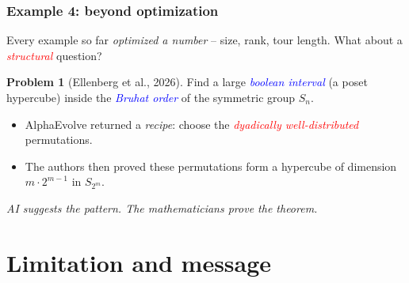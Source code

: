 \documentclass{beamer}
\theoremstyle{definition}
\newtheorem{prob}[thm]{Problem}
\newcommand\remph[1]{\emph{\textcolor{red}{#1}}}
\newcommand\bemph[1]{\emph{\textcolor{blue}{#1}}}
\begin{document}

\begin{frame}
  \frametitle{Example 4: beyond optimization}
  Every example so far \emph{optimized a number} -- size, rank, tour length.
  What about a \remph{structural} question?
  \pause
  \vspace{.25cm}

  \begin{prob}[Ellenberg et al., 2026]
    Find a large \bemph{boolean interval} (a poset hypercube) inside the
    \bemph{Bruhat order} of the symmetric group \( S_n \).
  \end{prob}
  \pause
  \vspace{.25cm}

  \begin{itemize}
    \setlength{\itemsep}{.12cm}
    \item[$\bullet$] AlphaEvolve returned a \emph{recipe}: choose the
      \remph{dyadically well-distributed} permutations.
      \pause
    \item[$\bullet$] The authors then proved these permutations form a
      hypercube of dimension \( m \cdot 2^{m-1} \) in \( S_{2^m} \).
  \end{itemize}
  \pause
  \vspace{.2cm}

  \begin{center}
    \emph{AI suggests the pattern. The mathematicians prove the theorem.}
  \end{center}
\end{frame}


\section{Limitation and message}

\end{document}
